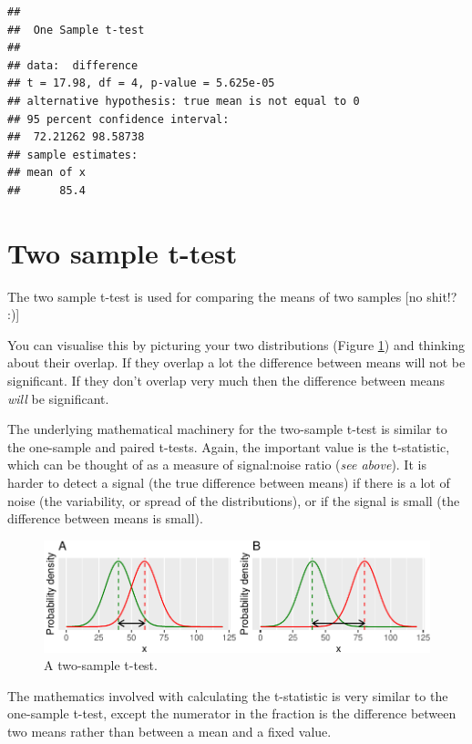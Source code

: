 \documentclass[
  a4paperpaper,
]{book}
\begin{document}
\begin{verbatim}
## 
## 	One Sample t-test
## 
## data:  difference
## t = 17.98, df = 4, p-value = 5.625e-05
## alternative hypothesis: true mean is not equal to 0
## 95 percent confidence interval:
##  72.21262 98.58738
## sample estimates:
## mean of x 
##      85.4
\end{verbatim}

\hypertarget{two-sample-t-test}{%
\section{Two sample t-test}\label{two-sample-t-test}}

The two sample t-test is used for comparing the means of two samples {[}no shit!? :){]}

You can visualise this by picturing your two distributions (Figure \ref{fig:twosample}) and thinking about their overlap. If they overlap a lot the difference between means will not be significant. If they don't overlap very much then the difference between means \emph{will} be significant.

The underlying mathematical machinery for the two-sample t-test is similar to the one-sample and paired t-tests.
Again, the important value is the t-statistic, which can be thought of as a measure of signal:noise ratio (\emph{see above}). It is harder to detect a signal (the true difference between means) if there is a lot of noise (the variability, or spread of the distributions), or if the signal is small (the difference between means is small).

\begin{figure}[ht]

{\centering \includegraphics{BB852_files/figure-latex/twosample-1} 

}

\caption{A two-sample t-test.}\label{fig:twosample}
\end{figure}

The mathematics involved with calculating the t-statistic is very similar to the one-sample t-test, except the numerator in the fraction is the difference between two means rather than between a mean and a fixed value.
\end{document}
